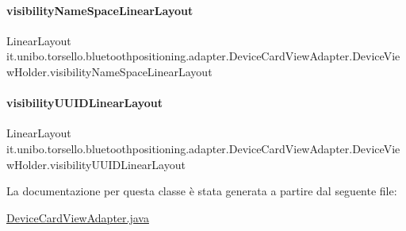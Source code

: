 \paragraph{\texorpdfstring{visibility\+Name\+Space\+Linear\+Layout}{visibilityNameSpaceLinearLayout}}
{\footnotesize\ttfamily Linear\+Layout it.\+unibo.\+torsello.\+bluetoothpositioning.\+adapter.\+Device\+Card\+View\+Adapter.\+Device\+View\+Holder.\+visibility\+Name\+Space\+Linear\+Layout\hspace{0.3cm}{\ttfamily [package]}}

\hypertarget{classit_1_1unibo_1_1torsello_1_1bluetoothpositioning_1_1adapter_1_1DeviceCardViewAdapter_1_1DeviceViewHolder_a72e4e3a233aa8cff4c3fe8e28a156095_a72e4e3a233aa8cff4c3fe8e28a156095}{}\label{classit_1_1unibo_1_1torsello_1_1bluetoothpositioning_1_1adapter_1_1DeviceCardViewAdapter_1_1DeviceViewHolder_a72e4e3a233aa8cff4c3fe8e28a156095_a72e4e3a233aa8cff4c3fe8e28a156095} 
\paragraph{\texorpdfstring{visibility\+U\+U\+I\+D\+Linear\+Layout}{visibilityUUIDLinearLayout}}
{\footnotesize\ttfamily Linear\+Layout it.\+unibo.\+torsello.\+bluetoothpositioning.\+adapter.\+Device\+Card\+View\+Adapter.\+Device\+View\+Holder.\+visibility\+U\+U\+I\+D\+Linear\+Layout\hspace{0.3cm}{\ttfamily [package]}}



La documentazione per questa classe è stata generata a partire dal seguente file\+:\begin{DoxyCompactItemize}
\item 
\hyperlink{DeviceCardViewAdapter_8java}{Device\+Card\+View\+Adapter.\+java}\end{DoxyCompactItemize}
